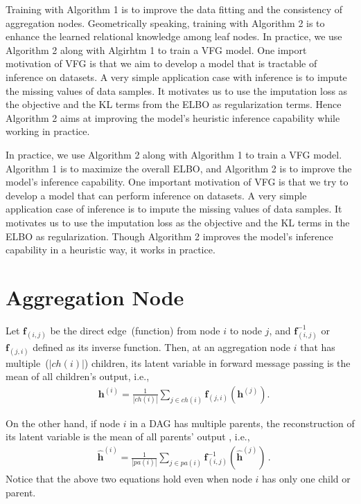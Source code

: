 \documentclass[twoside]{article}
\begin{document}
{\color{red}
 Training with Algorithm 1 is to improve the data fitting and the consistency of aggregation nodes. Geometrically speaking, training with Algorithm 2 is to enhance the learned relational knowledge among leaf nodes. In practice, we use  Algorithm 2  along with Algirhtm 1 to train a VFG model. 
One import motivation of VFG is that we aim to develop a model that is tractable of inference on datasets. 
A very simple application case with inference is to impute the missing values of data samples.  
It motivates us to use the imputation loss as the objective and the KL terms from the ELBO as regularization terms. 
Hence Algorithm 2 aims at improving the model's heuristic inference capability while working in practice.

 In practice, we use Algorithm 2 along with Algorithm 1 to train a VFG model.  Algorithm 1 is to maximize the overall ELBO, and Algorithm 2 is to improve the model's inference capability. One important motivation of VFG is that we try to develop a model that can perform inference on datasets. A very simple application case of inference is to impute the missing values of data samples.  It motivates us to use the imputation loss as the objective and the KL terms in the ELBO as regularization. 
 Though Algorithm 2 improves the model's inference capability in a heuristic way, it works in practice.
 }
 


\section{Aggregation Node}\label{sec:aggr_supp}

Let $\mathbf{f}_{(i, j)}$ be the direct edge~(function) from node $i$ to node $j$, and $\mathbf{f}^{-1}_{ (i, j)}$ or  $\mathbf{f}_{ (j, i)}$ defined as its inverse function. Then, at an aggregation node $i$ that has multiple~($|ch(i)|$) children, its latent variable in forward message passing is the mean of all children's output, i.e.,
 \begin{align}\label{eq:child_avg}
&  \mathbf{h}^{(i)} = \frac{1}{|ch(i)|} \sum_{j \in ch(i) } \mathbf{f}_{(j,i)}(\mathbf{h}^{(j)})  .
\end{align}

On the other hand, if node $i$ in a DAG  has multiple parents, the reconstruction of its latent variable is the mean of all parents' output , i.e.,
 \begin{align}\label{eq:parent_avg}
 &\widehat{\mathbf{h}}^{(i)} = \frac{1}{|pa(i)|} \sum_{j \in pa(i) } \mathbf{f}^{-1}_{ (i,j)}(\widehat{\mathbf{h}}^{(j)}) \, .
\end{align}%
Notice that the above two equations hold even when node $i$ has only one child or parent.
\end{document}
